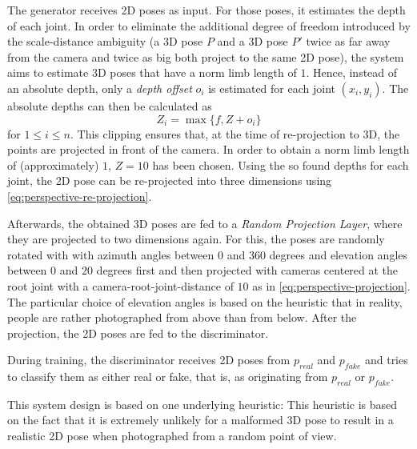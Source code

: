 The generator receives 2D poses as input.
For those poses, it estimates the depth of each joint.
In order to eliminate the additional degree of freedom introduced by the scale-distance ambiguity (a 3D pose $P$ and a 3D pose $P'$ twice as far away from the camera and twice as big both project to the same 2D pose), the system aims to estimate 3D poses that have a norm limb length of $1$.
Hence, instead of an absolute depth, only a \emph{depth offset} $o_i$ is estimated for each joint $(x_i, y_i)$.
The absolute depths can then be calculated as
\begin{equation}
	\label{eq:depth-clipping}
	Z_i = \max \{f, Z + o_i\}
\end{equation}
for $1 \leq i \leq n$.
This clipping ensures that, at the time of re-projection to 3D, the points are projected in front of the camera.
In order to obtain a norm limb length of (approximately) $1$, $Z = 10$ has been chosen.
Using the so found depths for each joint, the 2D pose can be re-projected into three dimensions using \autoref{eq:perspective-re-projection}.

Afterwards, the obtained 3D poses are fed to a \emph{Random Projection Layer}, where they are projected to two dimensions again.
For this, the poses are randomly rotated with with azimuth angles between $0$ and $360$ degrees and elevation angles between $0$ and $20$ degrees first and then projected with cameras centered at the root joint with a camera-root-joint-distance of $10$ as in \autoref{eq:perspective-projection}.
The particular choice of elevation angles is based on the heuristic that in reality, people are rather photographed from above than from below.
After the projection, the 2D poses are fed to the discriminator.

During training, the discriminator receives 2D poses from $p_{real}$ and $p_{fake}$ and tries to classify them as either real or fake, that is, as originating from $p_{real}$ or $p_{fake}$.

This system design is based on one underlying heuristic:\vspace{.5em}\newline
\vspace{.5em}
\newline
This heuristic is based on the fact that it is extremely unlikely for a malformed 3D pose to result in a realistic 2D pose when photographed from a random point of view.



